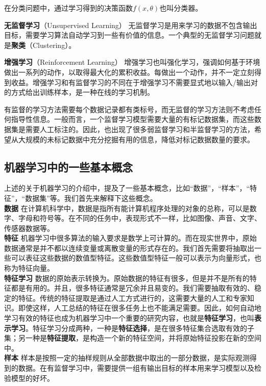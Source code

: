 \documentclass[11pt,fleqn, UTF8]{ctexbook} %
\begin{document}
在分类问题中，通过学习得到的决策函数$f(x, \theta)$也叫分类器。

\textbf{无监督学习}（Unsupervised Learning） 无监督学习是用来学习的数据不包含输出目标，需要学习算法自动学习到一些有价值的信息。一个典型的无监督学习问题就是\textbf{聚类}（Clustering）。

\textbf{增强学习}（Reinforcement Learning） 增强学习也叫强化学习，强调如何基于环境做出一系列的动作，以取得最大化的累积收益。每做出一个动作，并不一定立刻得到收益。增强学习和有监督学习的不同在于增强学习不需要显式地以输入/输出对的方式给出训练样本，是一种在线的学习机制。


有监督的学习方法需要每个数据记录都有类标号，而无监督的学习方法则不考虑任何指导性信息。一般而言，一个监督学习模型需要大量的有标记数据集，而这些数据集是需要人工标注的。因此，也出现了很多弱监督学习和半监督学习的方法，希望从大规模的未标记数据中充分挖掘有用的信息，降低对标记数据数量的要求。

\subsection{机器学习中的一些基本概念}
上述的关于机器学习的介绍中，提及了一些基本概念，比如“数据”，“样本”，“特征”，“数据集”等。我们首先来解释下这些概念。\\

\textbf{数据}
在计算机科学中，数据是指所有能计算机程序处理的对象的总称，可以是数字、字母和符号等。在不同的任务中，表现形式不一样，比如图像、声音、文字、传感器数据等。\\

\textbf{特征}
机器学习中很多算法的输入要求是数学上可计算的。而在现实世界中，原始数据通常是并不都以连续变量或离散变量的形式存在的。我们首先需要将抽取出一些可以表征这些数据的数值型特征。这些数值型特征一般可以表示为向量形式，也称为特征向量。\\

\textbf{特征学习}
数据的原始表示转换为。原始数据的特征有很多，但是并不是所有的特征都是有用的。并且，很多特征通常是冗余并且易变的。我们需要抽取有效的、稳定的特征。传统的特征提取是通过人工方式进行的，这需要大量的人工和专家知识。即使这样，人工总结的特征在很多任务上也不能满足需要。因此，如何自动地学习有效的特征也成为机器学习中一个重要的研究内容，也就是\textbf{特征学习}，也叫\textbf{表示学习}。特征学习分成两种，一种是\textbf{特征选择}，是在很多特征集合选取有效的子集；另一种是\textbf{特征提取}，是构造一个新的特征空间，并将原始特征投影在新的空间中。\\

\textbf{样本}
样本是按照一定的抽样规则从全部数据中取出的一部分数据，是实际观测得到的数据。在有监督学习中，需要提供一组有输出目标的样本用来学习模型以及检验模型的好坏。\\
\end{document}
